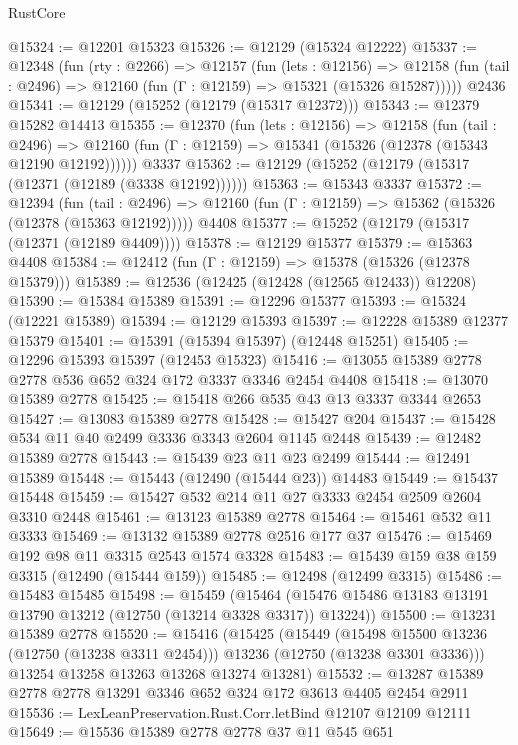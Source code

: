 \begin{lexlean}{RustCore}
\begin{coremodule}
@15324 := @12201 @15323
@15326 := @12129 (@15324 @12222)
@15337 := @12348
    (fun (rty : @2266) =>
    @12157
      (fun (lets : @12156) =>
      @12158 (fun (tail : @2496) => @12160 (fun (Γ : @12159) => @15321 (@15326 @15287)))))
    @2436
@15341 := @12129 (@15252 (@12179 (@15317 @12372)))
@15343 := @12379 @15282 @14413
@15355 := @12370
    (fun (lets : @12156) =>
    @12158
      (fun (tail : @2496) =>
      @12160 (fun (Γ : @12159) => @15341 (@15326 (@12378 (@15343 @12190 @12192))))))
    @3337
@15362 := @12129 (@15252 (@12179 (@15317 (@12371 (@12189 (@3338 @12192))))))
@15363 := @15343 @3337
@15372 := @12394
    (fun (tail : @2496) => @12160 (fun (Γ : @12159) => @15362 (@15326 (@12378 (@15363 @12192)))))
    @4408
@15377 := @15252 (@12179 (@15317 (@12371 (@12189 @4409))))
@15378 := @12129 @15377
@15379 := @15363 @4408
@15384 := @12412 (fun (Γ : @12159) => @15378 (@15326 (@12378 @15379)))
@15389 := @12536 (@12425 (@12428 (@12565 @12433)) @12208)
@15390 := @15384 @15389
@15391 := @12296 @15377
@15393 := @15324 (@12221 @15389)
@15394 := @12129 @15393
@15397 := @12228 @15389 @12377 @15379
@15401 := @15391 (@15394 @15397) (@12448 @15251)
@15405 := @12296 @15393 @15397 (@12453 @15323)
@15416 := @13055 @15389 @2778 @2778 @536 @652 @324 @172 @3337 @3346 @2454 @4408
@15418 := @13070 @15389 @2778
@15425 := @15418 @266 @535 @43 @13 @3337 @3344 @2653
@15427 := @13083 @15389 @2778
@15428 := @15427 @204
@15437 := @15428 @534 @11 @40 @2499 @3336 @3343 @2604 @1145 @2448
@15439 := @12482 @15389 @2778
@15443 := @15439 @23 @11 @23 @2499
@15444 := @12491 @15389
@15448 := @15443 (@12490 (@15444 @23)) @14483
@15449 := @15437 @15448
@15459 := @15427 @532 @214 @11 @27 @3333 @2454 @2509 @2604 @3310 @2448
@15461 := @13123 @15389 @2778
@15464 := @15461 @532 @11 @3333
@15469 := @13132 @15389 @2778 @2516 @177 @37
@15476 := @15469 @192 @98 @11 @3315 @2543 @1574 @3328
@15483 := @15439 @159 @38 @159 @3315 (@12490 (@15444 @159))
@15485 := @12498 (@12499 @3315)
@15486 := @15483 @15485
@15498 := @15459
    (@15464 (@15476 @15486 @13183 @13191 @13790 @13212 (@12750 (@13214 @3328 @3317)) @13224))
@15500 := @13231 @15389 @2778
@15520 := @15416
    (@15425
      (@15449
        (@15498 @15500 @13236 (@12750 (@13238 @3311 @2454)))
        @13236
        (@12750 (@13238 @3301 @3336)))
      @13254
      @13258
      @13263
      @13268
      @13274
      @13281)
@15532 := @13287 @15389 @2778 @2778 @13291 @3346 @652 @324 @172 @3613 @4405 @2454 @2911
@15536 := LexLeanPreservation.Rust.Corr.letBind @12107 @12109 @12111
@15649 := @15536
    @15389
    @2778
    @2778
    @37
    @11
    @545
    @651

\end{coremodule}
\end{lexlean}
